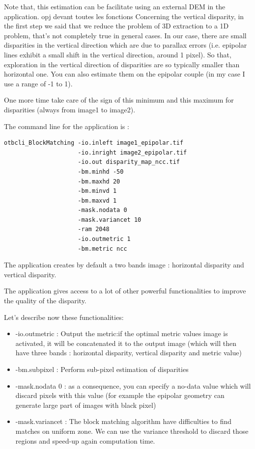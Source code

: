Note that, this estimation can be facilitate using an external DEM in the
 application.  opj devant toutes
les fonctions Concerning the vertical disparity, in the first step we said that
we reduce the problem of 3D extraction to a 1D problem, that's not completely
true in general cases. In our case, there are small disparities in the vertical
direction which are due to parallax errors (i.e. epipolar lines exhibit a small
shift in the vertical direction, around 1 pixel). So that, exploration in the
vertical direction of disparities are so typically smaller than horizontal
one. You can also estimate them on the epipolar couple (in my case I use a range
of -1 to 1).

One more time take care of the sign of this minimum and this maximum for
disparities (always from image1 to image2).

The command line for the  application is :
\begin{verbatim}
otbcli_BlockMatching -io.inleft image1_epipolar.tif
                     -io.inright image2_epipolar.tif
                     -io.out disparity_map_ncc.tif
                     -bm.minhd -50
                     -bm.maxhd 20
                     -bm.minvd 1
                     -bm.maxvd 1
                     -mask.nodata 0
                     -mask.variancet 10
                     -ram 2048
                     -io.outmetric 1
                     -bm.metric ncc
\end{verbatim}

The application creates by default a two bands image : horizontal disparity and
vertical disparity.

The  application gives access to a lot of other
powerful functionalities to improve the quality of the disparity.

Let's describe now these functionalities:

\begin{itemize}
\item -io.outmetric : Output the metric:if the optimal metric values image is
  activated, it will be concatenated it to the output image (which will then
  have three bands : horizontal disparity, vertical disparity and metric value)
\item -bm.subpixel : Perform sub-pixel estimation of disparities
\item -mask.nodata 0 : as a consequence, you can specify a no-data value which
  will discard pixels with this value (for example the epipolar geometry can
  generate large part of images with black pixel)
\item -mask.variancet : The block matching algorithm have difficulties to find
  matches on uniform zone. We can use the variance threshold to discard those
  regions and speed-up again computation time.
\end{itemize}

